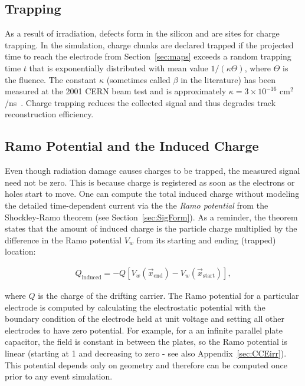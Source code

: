 \subsection{Trapping}
\label{sec:chargetrapping}

As a result of irradiation, defects form in the silicon and are sites for charge trapping.  In the simulation, charge chunks are declared trapped if the projected time to reach the electrode from Section~\ref{sec:maps} exceeds a random trapping time $t$ that is exponentially distributed with mean value $1/(\kappa\Theta)$, where $\Theta$ is the fluence.  The constant $\kappa$ (sometimes called $\beta$ in the literature) has been measured at the 2001 CERN  beam test and is approximately $\kappa=3\times 10^{-16}$ cm${}^2$/ns~\cite{trapping2}.  Charge trapping reduces the collected signal and thus degrades track reconstruction efficiency.

\subsection{Ramo Potential and the Induced Charge}
\label{sec:ramo}

Even though radiation damage causes charges to be trapped, the measured signal need not be zero.  This is because charge is registered as soon as the electrons or holes start to move.  One can compute the total induced charge without modeling the detailed time-dependent current via the the \textit{Ramo potential} from the Shockley-Ramo theorem (see Section~\ref{sec:SigForm}).  As a reminder, the theorem states that the amount of induced charge is the particle charge multiplied by the difference in the Ramo potential $V_w$ from its starting and ending (trapped) location:

\begin{align}
\label{eq:ramo}
Q_\text{induced} = -Q[V_w(\vec{x}_\text{end})-V_w(\vec{x}_\text{start})],
\end{align}

where $Q$ is the charge of the drifting carrier.  The Ramo potential for a particular electrode is computed by calculating the electrostatic potential with the boundary condition of the electrode held at unit voltage and setting all other electrodes to have zero potential.  For example, for a an infinite parallel plate capacitor, the field is constant in between the plates, so the Ramo potential is linear (starting at 1 and decreasing to zero
 - see also Appendix~\ref{sec:CCEirr}).  This potential depends only on geometry and therefore can be computed once prior to any event simulation.   

